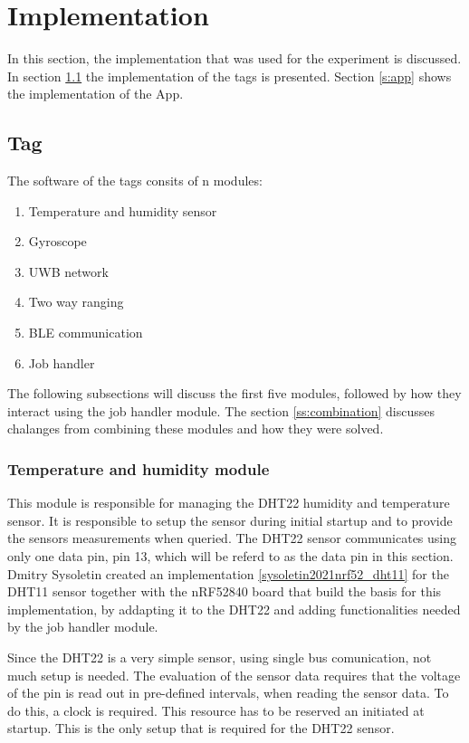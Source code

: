 \chapter{Implementation}
\label{c:implementation}

In this section, the implementation that was used for the experiment is discussed.
In section \ref{s:tag} the implementation of the tags is presented.
Section \ref{s:app} shows the implementation of the App.

\section{Tag}
\label{s:tag}
The software of the tags consits of n modules:
\begin{enumerate}
	\item Temperature and humidity sensor
	\item Gyroscope
	\item UWB network
	\item Two way ranging
	\item BLE communication
	\item Job handler
\end{enumerate}
The following subsections will discuss the first five modules, followed by how they interact using the job handler module.
The section \ref{ss:combination} discusses chalanges from combining these modules and how they were solved.

\subsection{Temperature and humidity module}
\label{ss:temp_hum_module}
This module is responsible for managing the DHT22 humidity and temperature sensor.
It is responsible to setup the sensor during initial startup and to provide the sensors measurements when queried.
The DHT22 sensor communicates using only one data pin, pin 13, which will be referd to as the data pin in this section.
Dmitry Sysoletin created an implementation \ref{sysoletin2021nrf52_dht11} for the DHT11 sensor together with the nRF52840 board that build the basis for this implementation, by addapting it to the DHT22 and adding functionalities needed by the job handler module.


Since the DHT22 is a very simple sensor, using single bus comunication, not much setup is needed.
The evaluation of the sensor data requires that the voltage of the pin is read out in pre-defined intervals, when reading the sensor data.
To do this, a clock is required.
This resource has to be reserved an initiated at startup.
This is the only setup that is required for the DHT22 sensor.


